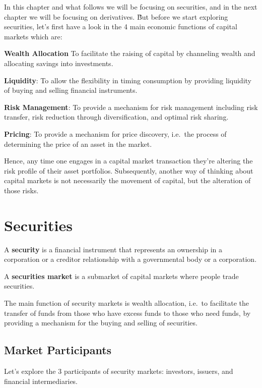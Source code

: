 In this chapter and what follows we will be focusing on securities, and in the next chapter we will be focusing on
derivatives. \v

But before we start exploring securities, let's first have a look in the 4 main economic functions of capital markets
which are:
\bit
\item \textbf{Wealth Allocation} To facilitate the raising of capital by channeling wealth and allocating savings into
investments.
\item \textbf{Liquidity}: To allow the flexibility in timing consumption by providing liquidity of buying and selling
financial instruments.
\item \textbf{Risk Management}: To provide a mechanism for risk management including risk transfer, risk reduction
through diversification, and optimal risk sharing.
\item \textbf{Pricing}: To provide a mechanism for price discovery, i.e.\ the process of determining the price of an
asset in the market.
\eit

Hence, any time one engages in a capital market transaction they're altering the risk profile of their asset portfolios.
Subsequently, another way of thinking about capital markets is not necessarily the movement of capital, but the
alteration of those risks.

\section{Securities}

\bd[Security]
A \textbf{security} is a financial instrument that represents an ownership in a corporation or a creditor relationship
with a governmental body or a corporation.
\ed

A \textbf{securities market} is a submarket of capital markets where people trade securities.
\ed

The main function of security markets is wealth allocation, i.e.\ to facilitate the transfer of funds from those who
have excess funds to those who need funds, by providing a mechanism for the buying and selling of securities.

\subsection{Market Participants}

Let's explore the 3 participants of security markets: investors, issuers, and financial intermediaries.

